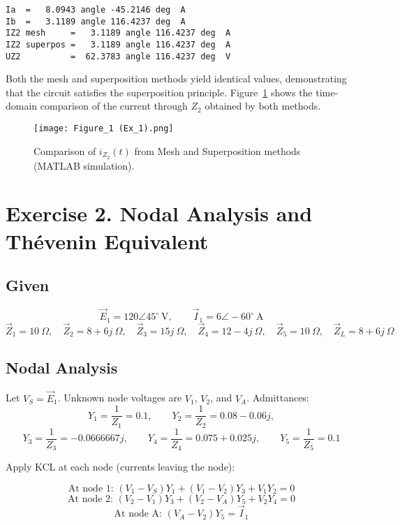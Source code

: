 \documentclass[a4paper,12pt]{article}
\begin{document}
\begin{verbatim}
Ia  =   8.0943 angle -45.2146 deg  A
Ib  =   3.1189 angle 116.4237 deg  A
IZ2 mesh     =   3.1189 angle 116.4237 deg  A
IZ2 superpos =   3.1189 angle 116.4237 deg  A
UZ2          =  62.3783 angle 116.4237 deg  V
\end{verbatim}

Both the mesh and superposition methods yield identical values, 
demonstrating that the circuit satisfies the superposition principle. 
Figure~\ref{fig:mesh_super} shows the time-domain comparison of the current 
through \(Z_2\) obtained by both methods.

\begin{figure}[H]
\centering
\texttt{[image: Figure\_1 (Ex\_1).png]}
\caption{Comparison of \(i_{Z_2}(t)\) from Mesh and Superposition methods (MATLAB simulation).}
\label{fig:mesh_super}
\end{figure}







\section{Exercise 2. Nodal Analysis and Thévenin Equivalent}

\subsection*{Given}
\[
\vec E_1 = 120\angle 45^\circ~\text{V}, \qquad 
\vec I_1 = 6\angle -60^\circ~\text{A}
\]
\[
\vec Z_1 = 10~\Omega, \quad 
\vec Z_2 = 8 + 6j~\Omega, \quad 
\vec Z_3 = 15j~\Omega, \quad 
\vec Z_4 = 12 - 4j~\Omega, \quad 
\vec Z_5 = 10~\Omega, \quad 
\vec Z_L = 8 + 6j~\Omega
\]

\subsection*{Nodal Analysis}

Let \(V_S = \vec E_1\). Unknown node voltages are \(V_1\), \(V_2\), and \(V_A\).  
Admittances:
\[
Y_1 = \frac{1}{Z_1} = 0.1, \qquad
Y_2 = \frac{1}{Z_2} = 0.08 - 0.06j,
\]
\[
Y_3 = \frac{1}{Z_3} = -0.0666667j, \qquad
Y_4 = \frac{1}{Z_4} = 0.075 + 0.025j, \qquad
Y_5 = \frac{1}{Z_5} = 0.1
\]

\noindent
Apply KCL at each node (currents leaving the node):

\[
\text{At node 1: } 
(V_1 - V_S)Y_1 + (V_1 - V_2)Y_3 + V_1 Y_2 = 0
\]
\[
\text{At node 2: } 
(V_2 - V_1)Y_3 + (V_2 - V_A)Y_5 + V_2 Y_4 = 0
\]
\[
\text{At node A: } 
(V_A - V_2)Y_5 = \vec I_1
\]
\end{document}
